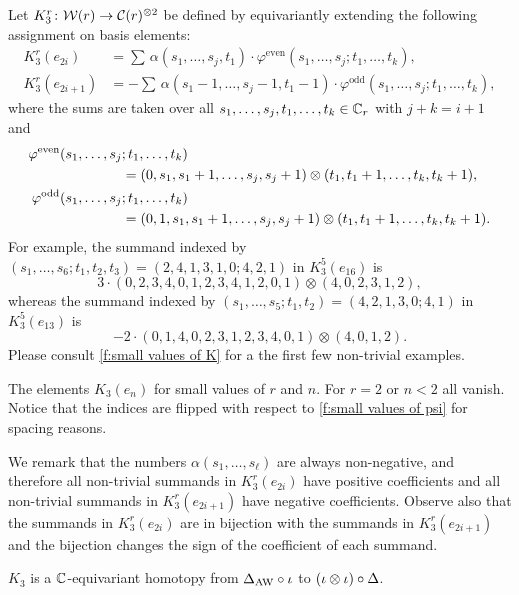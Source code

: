 Let $K_3^r \colon \mathcal{W}(r) \to \mathcal{C}(r)^{\otimes 2}$ be defined by equivariantly extending the following assignment on basis elements:
\[
\begin{split}
	K_3^r(e_{2i}) &= \sum \, \alpha(s_1,\ldots,s_j,t_1)\cdot\varphi^{\mathrm{even}}(s_1,\dots,s_j;t_1,\dots,t_k), \\
	K_3^r(e_{2i+1}) &= -\sum \, \alpha(s_1-1,\ldots,s_j-1,t_1-1)\cdot \varphi^{\mathrm{odd}}(s_1,\dots,s_j;t_1,\dots,t_k),
\end{split}
\]
where the sums are taken over all $s_1,\dots,s_j,t_1,\dots,t_k \in \mathbb{C}_r$ with $j+k = i+1$ and
\begin{align*}
	\varphi^{\mathrm{even}}(s_1,\dots,s_j&;t_1,\dots,t_k) \\ &=
	(0,s_1,s_1+1,\dots,s_j,s_j+1) \otimes (t_1,t_1+1,\dots,t_k,t_k+1), \\
	\varphi^{\mathrm{odd}}(s_1,\dots,s_j&;t_1,\dots,t_k) \\ &=
	(0,1,s_1,s_1+1,\dots,s_j,s_j+1) \otimes (t_1,t_1+1,\dots,t_k,t_k+1).
\end{align*}
For example, the summand indexed by $(s_1,\ldots,s_6;t_1,t_2,t_3) = (2,4,1,3,1,0;4,2,1)$ in $K_3^5(e_{16})$ is
\[
3 \cdot (0,2,3,4,0,1,2,3,4,1,2,0,1) \otimes (4,0,2,3,1,2),
\]
whereas the summand indexed by $(s_1,\ldots,s_5;t_1,t_2) =(4,2,1,3,0;4,1)$ in $K_3^5(e_{13})$ is
\[
-2 \cdot (0,1,4,0,2,3,1,2,3,4,0,1) \otimes (4,0,1,2).
\]
Please consult \cref{f:small values of K} for a the first few non-trivial examples.

\begin{table}
	\centering
	
	\caption{The elements $K_3(e_n)$ for small values of $r$ and $n$. For $r=2$ or $n<2$ all vanish. Notice that the indices are flipped with respect to \cref{f:small values of psi} for spacing reasons.}
	\label{f:small values of K}
\end{table}

We remark that the numbers $\alpha(s_1,\ldots,s_\ell)$ are always non-negative, and therefore all non-trivial summands in $K_3^r(e_{2i})$ have positive coefficients and all non-trivial summands in $K_3^r(e_{2i+1})$ have negative coefficients.
Observe also that the summands in $K_3^r(e_{2i})$ are in bijection with the summands in $K_3^r(e_{2i+1})$ and the bijection changes the sign of the coefficient of each summand.

\begin{lemma}\label{l:K3}
	$K_3$ is a $\mathbb{C}$-equivariant homotopy from $\Delta_{\operatorname{AW}} \mathbin{\circ} \iota$ to $(\iota \otimes \iota) \mathbin{\circ} \Delta$.
\end{lemma}

